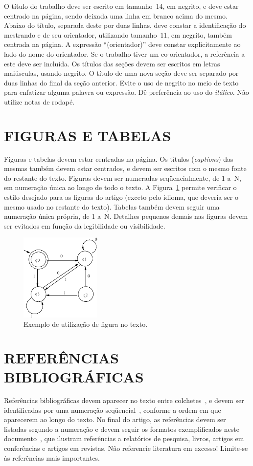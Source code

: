 \documentclass{sa}
\begin{document}
O título do trabalho deve ser escrito em tamanho~14, em negrito, e deve 
estar centrado na página, sendo deixada uma linha em branco acima do mesmo. 
Abaixo do título, separada deste por duas linhas, deve constar a identificação 
do mestrando e de seu orientador, utilizando tamanho~11, em negrito, também 
centrada na página. A expressão ``(orientador)'' deve constar explicitamente 
ao lado do nome do orientador. Se o trabalho tiver um co-orientador, a 
referência a este deve ser incluída. Os títulos das seções devem ser escritos 
em letras maiúsculas, usando negrito. O título de uma nova seção deve ser 
separado por duas linhas do final da seção anterior. Evite o uso de negrito 
no meio de texto para enfatizar alguma palavra ou expressão. 
Dê preferência ao uso do \emph{itálico}. Não utilize notas de rodapé.
\section{FIGURAS E TABELAS}
Figuras e tabelas devem estar centradas na página. Os títulos (\emph{captions}) 
das mesmas também devem estar centrados, e devem ser escritos com o mesmo 
fonte do restante do texto. Figuras devem ser numeradas seqüencialmente, de 
1 a~N, em numeração única ao longo de todo o texto. A Figura~\ref{fig} permite 
verificar o estilo desejado para as figuras do artigo (exceto pelo idioma, 
que deveria ser o mesmo usado no restante do texto). Tabelas também devem 
seguir uma numeração única própria, de 1 a~N\@. Detalhes pequenos demais nas 
figuras devem ser evitados em função da legibilidade ou visibilidade.

\begin{figure}
	\centerline{\includegraphics[width=4cm]{fig}}
	\caption{Exemplo de utilização de figura no texto.}
	\label{fig}
\end{figure}

\section{REFERÊNCIAS BIBLIOGRÁFICAS}
Referências bibliográficas devem aparecer no texto entre colchetes~\cite{chu}, e 
devem ser identificadas por uma numeração seqüencial~\cite{wagner}, conforme a 
ordem em que aparecerem ao longo do texto. No final do artigo, as referências 
devem ser listadas segundo a numeração e devem seguir os formatos 
exemplificados neste documento~\cite{chu}, que ilustram referências a 
relatórios de pesquisa, livros, artigos em conferências e artigos em revistas. 
Não referencie literatura em excesso! Limite-se às referências mais importantes.
\end{document}
